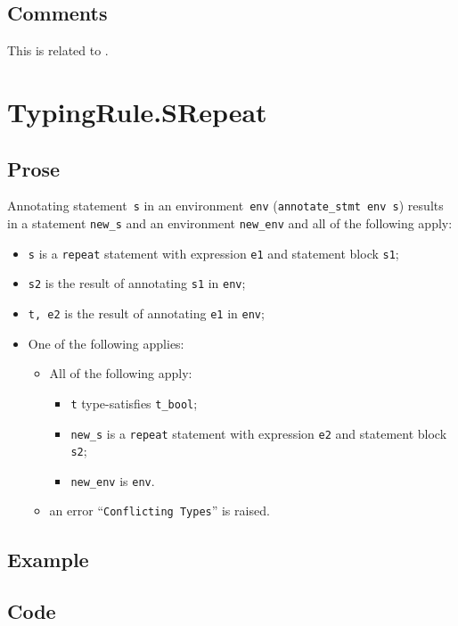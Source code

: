 \documentclass{book}
\begin{document}
\subsection{Comments}
    This is related to .

\section{TypingRule.SRepeat \label{sec:TypingRule.SRepeat}}

  \subsection{Prose}
Annotating statement~\texttt{s} in an environment~\texttt{env}
(\texttt{annotate\_stmt env s}) results in a statement \texttt{new\_s} and an
environment \texttt{new\_env} and all of the following apply:
   \begin{itemize}
   \item \texttt{s} is a \texttt{repeat} statement with expression \texttt{e1} and statement block \texttt{s1};
   \item \texttt{s2} is the result of annotating \texttt{s1} in \texttt{env};
   \item \texttt{t, e2} is the result of annotating \texttt{e1} in \texttt{env};
   \item One of the following applies:
     \begin{itemize}
     \item All of the following apply:
       \begin{itemize}
       \item \texttt{t} type-satisfies \texttt{t\_bool};
       \item \texttt{new\_s} is a \texttt{repeat} statement with expression \texttt{e2} and statement block \texttt{s2};
       \item \texttt{new\_env} is \texttt{env}.
       \end{itemize}
     \item an error ``\texttt{Conflicting Types}'' is raised.
     \end{itemize}
   \end{itemize}

  \subsection{Example}

  \subsection{Code}
\end{document}

